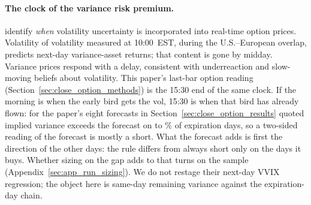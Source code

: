 \paragraph{The clock of the variance risk premium.}
\citet{HizmeriBevilacqua2025} identify \emph{when} volatility
uncertainty is incorporated into real-time option prices. Volatility
of volatility measured at 10:00~EST, during the U.S.--European
overlap, predicts next-day variance-asset returns; that content is
gone by midday. Variance prices respond with a delay, consistent with
underreaction and slow-moving beliefs about volatility. This paper's last-bar option
reading (Section~\ref{sec:close_option_methods}) is the 15:30 end of
the same clock. If the morning is when the early bird gets the vol,
\ifdefined\cmNdays\else\fi
15:30 is when that bird has already flown: for the paper's eight forecasts in
Section~\ref{sec:close_option_results} quoted implied variance exceeds the
forecast on \cmSellPaperMin{} to \cmSellPaperMax\% of expiration days, so a two-sided %
reading of the forecast is mostly a short. What the forecast adds is first the
direction of the other days: the rule differs from always short only on the days it
buys. Whether sizing on the gap adds to that turns on the sample
(Appendix~\ref{sec:app_run_sizing}). We do not restage
their next-day VVIX regression;
the object here is same-day remaining variance against the
expiration-day chain.